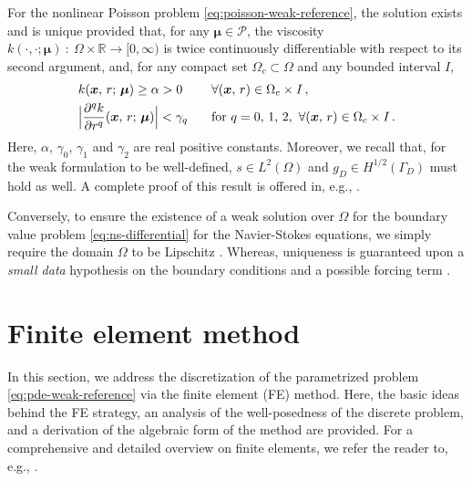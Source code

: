 \documentclass[12pt, a4paper, twoside, openright, notitlepage]{report}
\numberwithin{equation}{chapter}
\theoremstyle{theorem}
\theoremstyle{definition}
\theoremstyle{remark}
\theoremstyle{proposition}
\numberwithin{figure}{chapter}
\newcommand{\bg}[1]{\boldsymbol{#1}}
\begin{document}
		For the nonlinear Poisson problem \eqref{eq:poisson-weak-reference}, the solution exists and is unique provided that, for any $\bg{\mu} \in \mathcal{P}$, the viscosity $k(\cdot, \cdot; \bg{\mu}) ~ : ~ \Omega \times \mathbb{R} \rightarrow [0,\infty)$ is twice continuously differentiable with respect to its second argument, and, for any compact set $\Omega_c \subset \Omega$ and any bounded interval $I$,
		\begin{equation*}
			\begin{aligned}
				& k(\bg{x}, \, r; \, \bg{\mu}) \geq \alpha > 0 && \forall (\bg{x}, \, r) \in \Omega_c \times I \, , \\
				& \Big\lvert \dfrac{\partial^q k}{\partial r^q}(\bg{x}, \, r; \, \bg{\mu}) \Big\rvert < \gamma_q \hspace*{0.3cm} && \text{for} \,\, q = 0, \, 1, \, 2, \, \, \forall (\bg{x}, \, r) \in \Omega_c \times I \, .
			\end{aligned}
		\end{equation*}
		Here, $\alpha$, $\gamma_0$, $\gamma_1$ and $\gamma_2$ are real positive constants. Moreover, we recall that, for the weak formulation to be well-defined, $s \in L^2(\Omega)$ and $g_D \in H^{1/2}(\Gamma_D)$ must hold as well. A complete proof of this result is offered in, e.g., \cite{CR97}.
		
		Conversely, to ensure the existence of a weak solution over $\Omega$ for the boundary value problem \eqref{eq:ns-differential} for the Navier-Stokes equations, we simply require the domain $\Omega$ to be Lipschitz \cite{QMN15}. Whereas, uniqueness is guaranteed upon a \emph{small data} hypothesis on the boundary conditions and a possible forcing term \cite{ESW04}. 
		
	\vspace*{0.3cm}
		
	\section{Finite element method}
	\label{section:Finite element method}
	
		In this section, we address the discretization of the parametrized problem \eqref{eq:pde-weak-reference} via the finite element (FE) method. Here, the basic ideas behind the FE strategy, an analysis of the well-posedness of the discrete problem, and a derivation of the algebraic form of the method are provided. For a comprehensive and detailed overview on finite elements, we refer the reader to, e.g., \cite{Qua10}.
		
\end{document}
